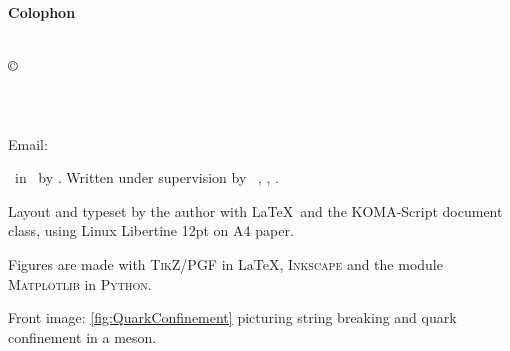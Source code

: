 \documentclass[../main.tex]{subfiles} %
\begin{document}
\clearpage %

\thispagestyle{empty} %


\vspace*{\fill} %

\begin{center} %
    \textbf{\textsf{Colophon}} %
\end{center}
\vspace{1em} %

\noindent %
\textsl{\Title}\\

\noindent
$\copyright$ \Year\ \Author\\
\Department\\
\University\\
\DepartmentAddress\\
Email: \AuthorEmail \vspace{1.5em} %



\noindent %
\Doctype\ in \MakeLowercase{\SubjectOfStudy}\ by \Author. Written under supervision by \SupervisorTitle\ \Supervisor, \Department, \University.
\vspace{.5em} %

\noindent %
Layout and typeset by the author with \LaTeX\, and the KOMA-Script document class, using Linux Libertine 12pt on A4 paper.
\vspace{.5em} %

\noindent %
Figures are made with \textsc{TikZ/PGF} in \LaTeX, \textsc{Inkscape} and the module \textsc{Matplotlib} in \textsc{Python}.
\vspace{.5em} %

\noindent
Front image: \cref{fig:QuarkConfinement} picturing string breaking and quark confinement in a meson.
%


\end{document}

